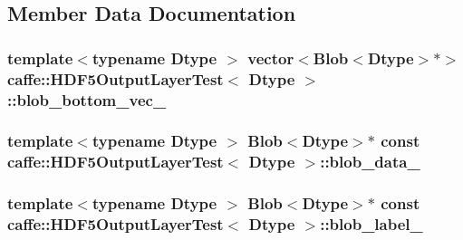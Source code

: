 \subsection{Member Data Documentation}
\hypertarget{classcaffe_1_1_h_d_f5_output_layer_test_a954c71b6deb34d3c68f41e74a98cb707}{
\subsubsection[{blob\+\_\+bottom\+\_\+vec\+\_\+}]{\setlength{\rightskip}{0pt plus 5cm}template$<$typename Dtype $>$ vector$<${\bf Blob}$<$Dtype$>$$\ast$$>$ {\bf caffe\+::\+H\+D\+F5\+Output\+Layer\+Test}$<$ Dtype $>$\+::blob\+\_\+bottom\+\_\+vec\+\_\+\hspace{0.3cm}{\ttfamily [protected]}}}\label{classcaffe_1_1_h_d_f5_output_layer_test_a954c71b6deb34d3c68f41e74a98cb707}
\hypertarget{classcaffe_1_1_h_d_f5_output_layer_test_a68d23919519dc2fccf5f851dc67bb03e}{
\subsubsection[{blob\+\_\+data\+\_\+}]{\setlength{\rightskip}{0pt plus 5cm}template$<$typename Dtype $>$ {\bf Blob}$<$Dtype$>$$\ast$ const {\bf caffe\+::\+H\+D\+F5\+Output\+Layer\+Test}$<$ Dtype $>$\+::blob\+\_\+data\+\_\+\hspace{0.3cm}{\ttfamily [protected]}}}\label{classcaffe_1_1_h_d_f5_output_layer_test_a68d23919519dc2fccf5f851dc67bb03e}
\hypertarget{classcaffe_1_1_h_d_f5_output_layer_test_aa87f34a2f1fed9e69cebe794fef7e1fb}{
\subsubsection[{blob\+\_\+label\+\_\+}]{\setlength{\rightskip}{0pt plus 5cm}template$<$typename Dtype $>$ {\bf Blob}$<$Dtype$>$$\ast$ const {\bf caffe\+::\+H\+D\+F5\+Output\+Layer\+Test}$<$ Dtype $>$\+::blob\+\_\+label\+\_\+\hspace{0.3cm}{\ttfamily [protected]}}}\label{classcaffe_1_1_h_d_f5_output_layer_test_aa87f34a2f1fed9e69cebe794fef7e1fb}
